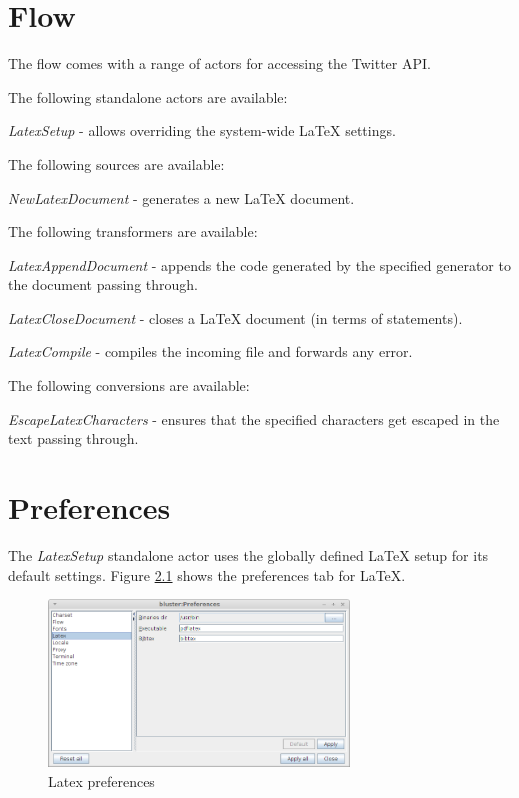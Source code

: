 \documentclass[a4paper]{book}
\begin{document}
\chapter{Flow}
The flow comes with a range of actors for accessing the Twitter API.

\noindent The following standalone actors are available:
\begin{tight_itemize}
	\item \textit{LatexSetup} - allows overriding the system-wide
	LaTeX settings.
\end{tight_itemize}

\noindent The following sources are available:
\begin{tight_itemize}
	\item \textit{NewLatexDocument} - generates a new LaTeX document.
\end{tight_itemize}

\noindent The following transformers are available:
\begin{tight_itemize}
	\item \textit{LatexAppendDocument} - appends the code generated by the
	specified generator to the document passing through.
	\item \textit{LatexCloseDocument} - closes a LaTeX document (in terms of statements).
	\item \textit{LatexCompile} - compiles the incoming file and forwards any error.
\end{tight_itemize}

\noindent The following conversions are available:
\begin{tight_itemize}
	\item \textit{EscapeLatexCharacters} - ensures that the specified
	characters get escaped in the text passing through.
\end{tight_itemize}

\chapter{Preferences}
\label{preferences}
The \textit{LatexSetup} standalone actor uses the globally defined
LaTeX setup for its default settings.
Figure \ref{latex_preferences} shows the preferences tab for LaTeX.
\begin{figure}[htb]
  \centering
  \includegraphics[width=8.0cm]{images/latex_preferences.png}
  \caption{Latex preferences}
  \label{latex_preferences}
\end{figure}


\end{document}
